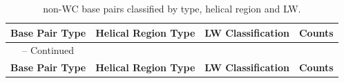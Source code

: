 \begin{center}
\begin{longtable}{c|c|c|c}
\caption{non-WC base pairs classified by type, helical region and LW.}
\label{tab:noWC_LW}\\ 
\hline 
\bf{Base Pair Type} & \bf{Helical Region Type} & \bf{LW
  Classification} & \bf{Counts}\\ \hline \hline
\endfirsthead

\multicolumn{1}{c}{{\tablename} \thetable{} -- Continued} \\
\hline 
\bf{Base Pair Type} & \bf{Helical Region Type} & \bf{LW
  Classification} & \bf{Counts}\\ \hline \hline
\endhead


\end{longtable}
\end{center}

